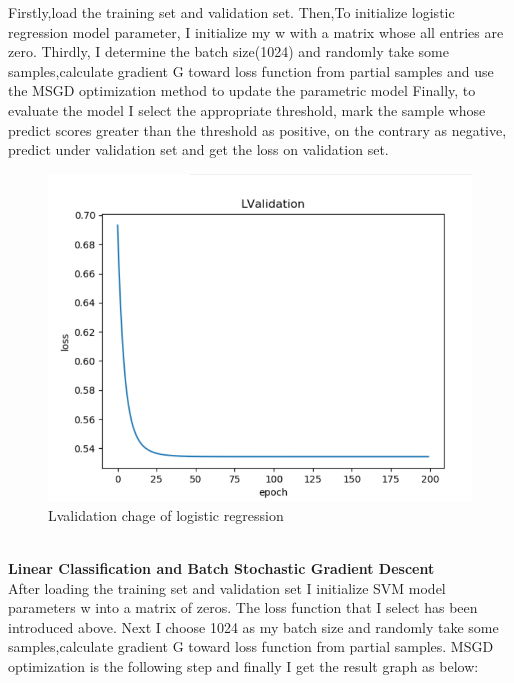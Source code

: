 \documentclass[journal, a4paper]{IEEEtran}
\begin{document}
Firstly,load the training set and validation set. Then,To initialize logistic regression model parameter, I initialize my w with a matrix whose all entries are zero. Thirdly, I determine the batch size(1024) and randomly take some samples,calculate gradient G toward loss function from partial samples and use the MSGD optimization method to update the parametric model
Finally, to evaluate the model I select the appropriate threshold, mark the sample whose predict scores greater than the threshold as positive, on the contrary as negative, predict under validation set and get the loss on validation set.
	\begin{figure}[!hbt]
		\begin{center}
		\includegraphics[width=\columnwidth]{logistic.png}
		\caption{Lvalidation chage of logistic regression}
		\label{fig2}
		\end{center}
	\end{figure}\\
\center \textbf{Linear Classification and Batch Stochastic Gradient Descent}\\
After loading the training set and validation set I initialize SVM model parameters w into a matrix of zeros. The loss function that I select has been introduced above. Next I choose 1024 as my batch size and randomly take some samples,calculate gradient G toward loss function from partial samples. MSGD optimization is the following step and finally I get the result graph as below:
\end{document}
